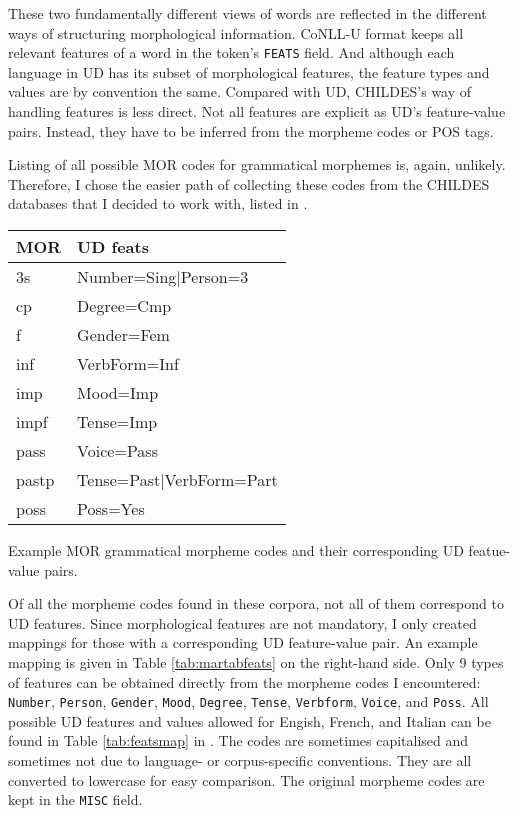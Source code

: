 These two fundamentally different views of words are reflected in the different ways of structuring morphological information. CoNLL-U format keeps all relevant features of a word in the token's \texttt{FEATS} field. And although each language in UD has its subset of morphological features, the feature types and values are by convention the same. Compared with UD, CHILDES's way of handling features is less direct. Not all features are explicit as UD's feature-value pairs. Instead, they have to be inferred from the morpheme codes or POS tags.

Listing of all possible MOR codes for grammatical morphemes is, again, unlikely. Therefore, I chose the easier path of collecting these codes from the CHILDES databases that I decided to work with, listed in .
\begin{margintable}[1\baselineskip]
\begin{tabularx}{1\textwidth}{@{}ll@{}}
\toprule
\textbf{MOR} & \textbf{UD feats}\\ \midrule
    3s & Number=Sing|Person=3\\
    cp & Degree=Cmp\\
    f & Gender=Fem\\
    inf & VerbForm=Inf\\
    imp & Mood=Imp\\
    impf & Tense=Imp\\
    pass & Voice=Pass\\
    pastp & Tense=Past|VerbForm=Part\\
    poss & Poss=Yes\\\bottomrule
\end{tabularx}
\caption{\label{tab:martabfeats}Example MOR grammatical morpheme codes and their corresponding UD featue-value pairs.}
\footnotesize
\end{margintable}
Of all the morpheme codes found in these corpora, not all of them correspond to UD features. Since morphological features are not mandatory, I only created mappings for those with a corresponding UD feature-value pair. An example mapping is given in Table \ref{tab:martabfeats} on the right-hand side. Only 9 types of features can be obtained directly from the morpheme codes I encountered: \texttt{Number}, \texttt{Person}, \texttt{Gender}, \texttt{Mood}, \texttt{Degree}, \texttt{Tense}, \texttt{Verbform}, \texttt{Voice}, and \texttt{Poss}. All possible UD features and values allowed for Engish, French, and Italian can be found in Table \ref{tab:featsmap} in . The codes are sometimes capitalised and sometimes not due to language- or corpus-specific conventions. They are all converted to lowercase for easy comparison. The original morpheme codes are kept in the \texttt{MISC} field.
